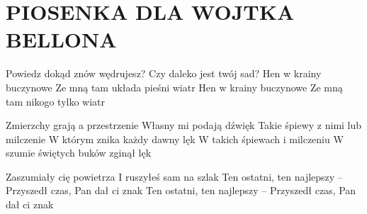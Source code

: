 \documentclass[../../../songbook.tex]{subfiles}
\begin{document}
\TabPositions{8cm} %
\section*{PIOSENKA DLA WOJTKA BELLONA}
\vspace{0.5cm}

Powiedz dokąd znów wędrujesz? 	 \newline
Czy daleko jest twój sad? 		 \newline
Hen w krainy buczynowe 			 \newline
Ze mną tam układa pieśni wiatr 	 \newline
Hen w krainy buczynowe 			 \newline
Ze mną tam nikogo tylko wiatr	 \newline

Zmierzchy grają a przestrzenie		\newline
Własny mi podają dźwięk				\newline
Takie śpiewy z nimi lub milczenie	\newline
W którym znika każdy dawny lęk		\newline
W takich śpiewach i milczeniu		\newline
W szumie świętych buków zginął lęk	\newline

Zaszumiały cię powietrza			\newline
I ruszyłeś sam na szlak				\newline
Ten ostatni, ten najlepszy –		\newline
Przyszedł czas, Pan dał ci znak		\newline
Ten ostatni, ten najlepszy –		\newline
Przyszedł czas, Pan dał ci znak		\newline
\end{document}
